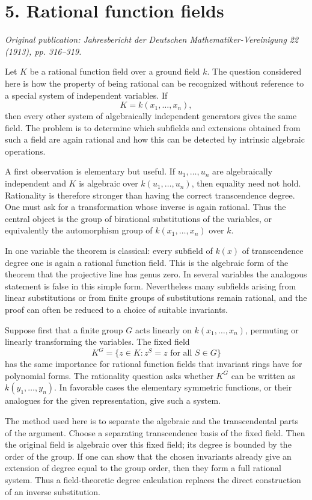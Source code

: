\documentclass[11pt]{article}
\begin{document}
\section{5. Rational function fields}

\textit{Original publication: Jahresbericht der Deutschen Mathematiker-Vereinigung 22 (1913), pp. 316--319.}

Let \(K\) be a rational function field over a ground field \(k\). The question considered here is
how the property of being rational can be recognized without reference to a special system of
independent variables. If \[   K=k(x_1,\ldots,x_n), \] then every other system of algebraically
independent generators gives the same field. The problem is to determine which subfields and
extensions obtained from such a field are again rational and how this can be detected by intrinsic
algebraic operations.


A first observation is elementary but useful. If \(u_1,\ldots,u_n\) are algebraically independent
and \(K\) is algebraic over \(k(u_1,\ldots,u_n)\), then equality need not hold. Rationality is
therefore stronger than having the correct transcendence degree. One must ask for a transformation
whose inverse is again rational. Thus the central object is the group of birational substitutions of
the variables, or equivalently the automorphism group of \(k(x_1,\ldots,x_n)\) over \(k\).


In one variable the theorem is classical: every subfield of \(k(x)\) of transcendence degree one is
again a rational function field. This is the algebraic form of the theorem that the projective line
has genus zero. In several variables the analogous statement is false in this simple form.
Nevertheless many subfields arising from linear substitutions or from finite groups of substitutions
remain rational, and the proof can often be reduced to a choice of suitable invariants.


Suppose first that a finite group \(G\) acts linearly on \(k(x_1,\ldots,x_n)\), permuting or
linearly transforming the variables. The fixed field \[   K^G=\{z\in K: z^S=z\text{ for all }S\in
G\} \] has the same importance for rational function fields that invariant rings have for polynomial
forms. The rationality question asks whether \(K^G\) can be written as \(k(y_1, \ldots,y_n)\). In
favorable cases the elementary symmetric functions, or their analogues for the given representation,
give such a system.


The method used here is to separate the algebraic and the transcendental parts of the argument.
Choose a separating transcendence basis of the fixed field. Then the original field is algebraic
over this fixed field; its degree is bounded by the order of the group. If one can show that the
chosen invariants already give an extension of degree equal to the group order, then they form a
full rational system. Thus a field-theoretic degree calculation replaces the direct construction of
an inverse substitution.
\end{document}
